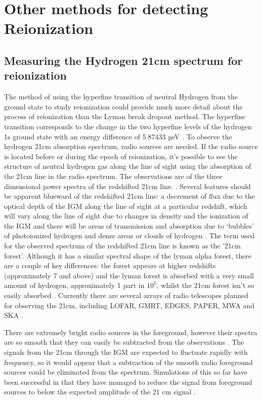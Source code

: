 
\section{Other methods for detecting Reionization} %
\label{sec:other_methods21cm}

        \subsection{Measuring the Hydrogen 21cm spectrum for reionization} %
	\label{sub:Measuring_21cm} 
The method of using the hyperfine transition of neutral Hydrogen from the ground state to study reionization could provide much more detail about the process of reionization than the Lyman break dropout method. The hyperfine transition corresponds to the change in the two hyperfine levels of the hydrogen 1s ground state with an energy difference of 5.87433 µeV \cite{hyperphysics21}. To observe the hydrogen 21cm absorption spectrum, radio sources are needed. If the radio source is located before or during the epoch of reionization, it’s possible to see the structure of neutral hydrogen gas along the line of sight using the absorption of the 21cm line in the radio spectrum\cite[2]{mack2012detecting}. The observations are of the three dimensional power spectra of the redshifted  21cm line. \cite[1]{liu2011method}.  Several features should be apparent blueward of the redshifted 21cm line: a decrement of flux due to the optical depth of the IGM along the line of sight at a particular redshift, which will vary along the line of sight due to changes in density and the ionization of the IGM and there will be areas of transmission and absorption due to ‘bubbles’ of photoionized hydrogen and dense areas or clouds of hydrogen \cite[2]{mack2012detecting}. The term used for the observed spectrum of the redshifted 21cm line is known as the '21cm forest'. Although it has a similar spectral shape of the lyman alpha forest, there are a couple of key differences: the forest appears at higher redshifts (approximately 7 and above) and the lyman forest is absorbed with a very small amount of hydrogen, approximately 1 part in $10^5$, whilst the 21cm forest isn't so easily absorbed \cite[2]{mack2012detecting}. Currently there are several arrays of radio telescopes planned for observing the 21cm, including  LOFAR, GMRT, EDGES, PAPER, MWA and SKA \cite[2]{mack2012detecting}.
	
There are extremely bright radio sources in the foreground, however their spectra are so smooth that they can easily be subtracted from the observations \cite{petrovic2011systematic}. The signals from the 21cm through the IGM are expected to fluctuate rapidly with frequency, so it would appear that a subtraction of the smooth radio foreground sources could be eliminated from the spectrum. Simulations of this so far have been successful in that they have managed to reduce the signal from foreground sources to below the expected amplitude of the 21 cm signal \cite[19]{liu2011method}.

